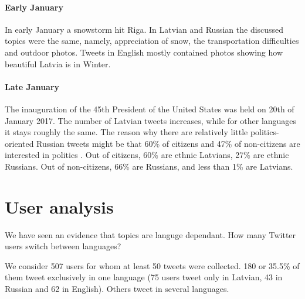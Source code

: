 \documentclass[11pt,a4paper]{article}
\begin{document}


\paragraph{Early January}

In early January a snowstorm hit Riga. In Latvian and Russian the discussed topics were the same, namely, appreciation of snow, the transportation difficulties and outdoor photos. Tweets in English mostly contained photos showing how beautiful Latvia is in Winter.

\paragraph{Late January}



The inauguration of the 45th President of the United States was held on 20th of January 2017. The number of Latvian tweets increases, while for other languages it stays roughly the same. The reason why there are relatively little politics-oriented Russian tweets might be that 60\% of citizens and 47\% of non-citizens are interested in politics \cite{civicsociety}. Out of citizens, 60\% are ethnic Latvians, 27\% are ethnic Russians. Out of non-citizens, 66\% are Russians, and less than 1\% are Latvians.\footnotemark{}


\section{User analysis}
\label{sec:lang-use}

We have seen an evidence that topics are languge dependant. How many Twitter users switch between languages?

We consider 507 users for whom at least 50 tweets were collected. 180 or 35.5\% of them tweet exclusively in one language (75 users tweet only in Latvian, 43 in Russian and 62 in English). Others tweet in several languages.
\end{document}
